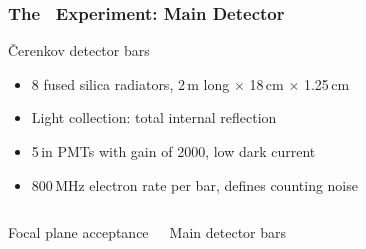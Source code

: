 \begin{frame}
 \frametitle{The \Qweak\ Experiment: Main Detector}
 \begin{block}{\v{C}erenkov detector bars}
  \begin{itemize}
   \item 8 fused silica radiators, 2\,m long $\times$ 18\,cm $\times$ 1.25\,cm
   \item Light collection: total internal reflection
   \item 5\,in PMTs with gain of 2000, low dark current
   \item 800\,MHz electron rate per bar, defines counting noise
  \end{itemize}
 \end{block}
 \begin{columns}[T]
   \begin{block}{Focal plane acceptance}
    \begin{center}
    \end{center}
   \end{block}
   \begin{block}{Main detector bars}
    \begin{center}
    \end{center}
   \end{block}
 \end{columns}
\end{frame}
